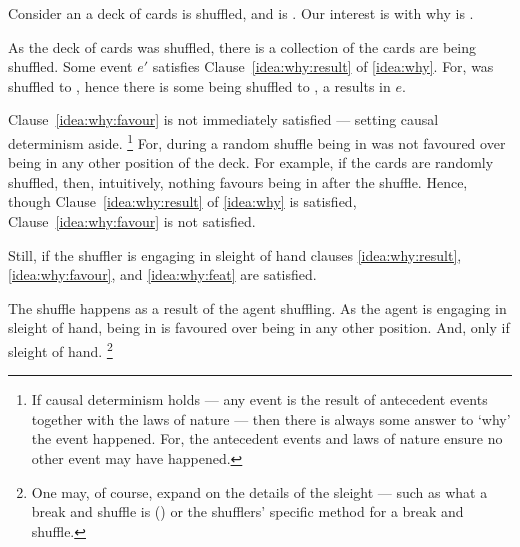 \begin{note}
  Consider an  a deck of cards is shuffled, and \mainCard{} is \mainCardPos{}.
  Our interest is with why \mainCard{} is \mainCardPos{}.

  As the deck of cards was shuffled, there is a collection of  the cards are being shuffled.
  Some event \(e'\) satisfies Clause~\ref{idea:why:result} of \autoref{idea:why}.
  For, \mainCard{} was shuffled to \mainCardPosX{}, hence there is some  \mainCard{} being shuffled to \mainCardPos{}, a results in \(e\).

  Clause~\ref{idea:why:favour} is not immediately satisfied --- setting causal determinism aside.%
  \footnote{
    \nocite{Hoefer:2023aa}%
    If causal determinism holds --- any event is the result of antecedent events together with the laws of nature --- then there is always some answer to `why' the event happened.
    For, the antecedent events and laws of nature ensure no other event may have happened.
  }
  For, during a random shuffle \mainCard{} being in \mainCardPos{} was not favoured over \mainCard{} being in any other position of the deck.
  For example, if the cards are randomly shuffled, then, intuitively, nothing favours \mainCard{} being in \mainCardPos{} after the shuffle.
  Hence, though Clause~\ref{idea:why:result} of \autoref{idea:why} is satisfied, Clause~\ref{idea:why:favour} is not satisfied.

  Still, if the shuffler is engaging in sleight of hand clauses \ref{idea:why:result}, \ref{idea:why:favour}, and \ref{idea:why:feat} are satisfied.

  The shuffle happens as a result of the agent shuffling.
  As the agent is engaging in sleight of hand, \mainCard{} being in \mainCardPos{} is favoured over \mainCard{} being in any other position.
  And, only if sleight of hand.%
  \footnote{
    One may, of course, expand on the details of the sleight --- such as what a break and shuffle is (\cite[cf.][189--190]{Hilliard:1994aa}) or the shufflers' specific method for a break and shuffle.
  }
\end{note}


